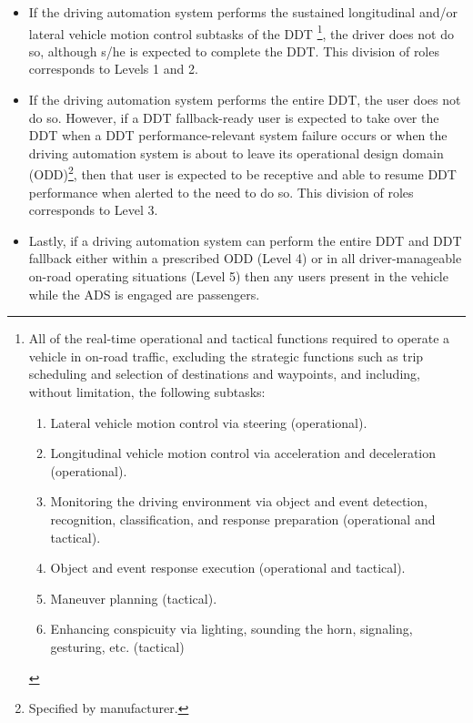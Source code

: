 \begin{itemize}

  \item If the driving automation system performs the sustained longitudinal and/or lateral vehicle motion control subtasks of the DDT
  \footnote{
      All of the real-time operational and tactical functions required to operate a vehicle in on-road traffic, excluding the strategic functions such as trip scheduling and selection of destinations and waypoints, and including, without limitation, the following subtasks:
      \begin{enumerate}
        \item Lateral vehicle motion control via steering (operational).
        \item Longitudinal vehicle motion control via acceleration and deceleration (operational).
        \item Monitoring the driving environment via object and event detection, recognition, classification, and response preparation (operational and tactical).
        \item Object and event response execution (operational and tactical).
        \item Maneuver planning (tactical).
        \item Enhancing conspicuity via lighting, sounding the horn, signaling, gesturing, etc. (tactical)
      \end{enumerate}
  }, the driver does not do so, although s/he is expected to complete the DDT. 
  This division of roles corresponds to Levels 1 and 2.
  \item If the driving automation system performs the entire DDT, the user does not do so. However, if a DDT fallback-ready user is expected to take over the DDT when a DDT performance-relevant system failure occurs or when the driving automation system is about to leave its operational design domain (ODD)\footnote{Specified by manufacturer.}, then that user is expected to be receptive and able to resume DDT performance when alerted to the need to do so. 
  This division of roles corresponds to Level 3.
  \item Lastly, if a driving automation system can perform the entire DDT and DDT fallback either within a prescribed ODD (Level 4) or in all driver-manageable on-road operating situations (Level 5) then any users present in the vehicle while the ADS is engaged are passengers. 
  
\end{itemize}

